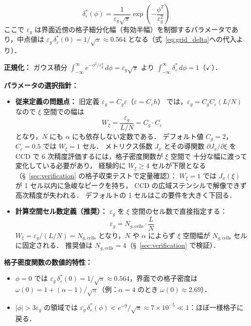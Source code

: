 \begin{equation}
  \delta_\varepsilon^*(\phi) =
  \frac{1}{\varepsilon_g\sqrt{\pi}}\exp\!\left(-\frac{\phi^2}{\varepsilon_g^2}\right)
  \label{eq:grid_delta}
\end{equation}
ここで $\varepsilon_g$ は界面近傍の格子細分化幅（有効半幅）を制御するパラメータであり，中点値は $\varepsilon_g\,\delta_\varepsilon^*(0) = 1/\sqrt{\pi} \approx 0.564$ となる（式~\eqref{eq:grid_delta}への代入より）．

\textbf{正規化：} ガウス積分 $\int_{-\infty}^\infty e^{-\phi^2/\varepsilon_g^2}\,d\phi = \varepsilon_g\sqrt{\pi}$ より $\int_{-\infty}^\infty \delta_\varepsilon^*\,d\phi = 1$（$\checkmark$）．

\textbf{パラメータの選択指針：}
\begin{itemize}
  \item \textbf{従来定義の問題点：}
        旧定義 $\varepsilon_g = C_{g} \varepsilon$（$\varepsilon = C_\varepsilon h$）
        では，$\varepsilon_g = C_g C_\varepsilon (L/N)$ なので
        $\xi$ 空間での幅は
        \[
          W_\xi = \frac{\varepsilon_g}{L/N} = C_{g} \cdot C_\varepsilon
        \]
        となり，$N$ にも $\alpha$ にも依存しない定数である．
        デフォルト値 $C_{g} = 2$，$C_\varepsilon = 0.5$ では $W_\xi = 1$ セル．
        メトリクス係数 $J_x$ とその導関数 $\partial J_x/\partial\xi$ を CCD で
        6 次精度評価するには，格子密度関数が $\xi$ 空間で
        十分な幅に渡って変化している必要があり，
        経験的に $W_\xi \ge 4$ セルが下限となる
        （§~\ref{sec:verification} の格子収束テストで定量確認）：
        $W_\xi = 1$ では $J_x(\xi)$ が 1 セル以内に急峻なピークを持ち，
        CCD の広域ステンシルで解像できず高次精度が失われる．
        デフォルトの 1 セルはこの要件を大きく下回る．
  \item \textbf{計算空間セル数定義（推奨）：}
        $\varepsilon_g$ を $\xi$ 空間のセル数で直接指定する：
        \begin{equation}
          \varepsilon_g = N_{g,\text{cells}} \cdot \frac{L}{N}
          \label{eq:eps_g_xi}
        \end{equation}
        $W_\xi = \varepsilon_g/(L/N) = N_{g,\text{cells}}$ となり，$N$ や $\alpha$ によらず
        $\xi$ 空間幅が $N_{g,\text{cells}}$ セルに固定される．
        推奨値は $N_{g,\text{cells}} = 4$（§~\ref{sec:verification} で検証）．
\end{itemize}

\noindent\textbf{格子密度関数の数値的特性：}
\begin{itemize}
  \item $\phi = 0$ では $\varepsilon_g\,\delta_\varepsilon^*(0) = 1/\sqrt{\pi} \approx 0.564$，界面での格子密度は $\omega(0) = 1 + (\alpha-1)/\sqrt{\pi}$（例：$\alpha = 4$ のとき $\omega(0) \approx 2.69$）．
  \item $|\phi| > 3\varepsilon_g$ の領域では $\varepsilon_g\,\delta_\varepsilon^*(\phi) < e^{-9}/\sqrt{\pi} \approx 7\times10^{-5} \ll 1$：ほぼ一様格子に戻る．
\end{itemize}

